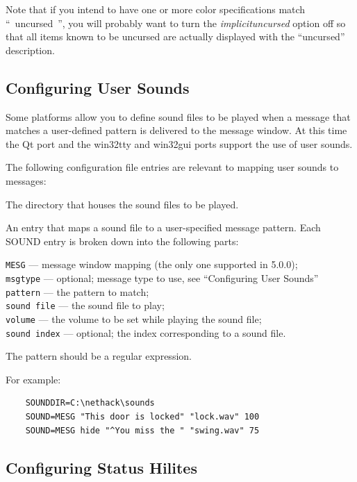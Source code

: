 \documentclass[titlepage]{article}
\begin{document}
Note that if you intend to have one or more color specifications match
``~uncursed~'', you will probably want to turn the
\textit{implicit\textunderscore uncursed}
option off so that all items known to be uncursed are actually
displayed with the ``uncursed'' description.

\subsection*{Configuring User Sounds}

Some platforms allow you to define sound files to be played when a message
that matches a user-defined pattern is delivered to the message window.
At this time the Qt port and the win32tty and win32gui ports support the
use of user sounds.

The following configuration file entries are relevant to mapping user sounds
to messages:

\begin{description}[font=\mdseries\itshape]
\item[SOUNDDIR]
The directory that houses the sound files to be played.
\item[SOUND]
An entry that maps a sound file to a user-specified message pattern.
Each SOUND entry is broken down into the following parts:

\texttt{MESG} --- message window mapping (the only one supported in 5.0.0);\\
\texttt{msgtype} --- optional; message type to use, see ``Configuring User Sounds''\\
\texttt{pattern} --- the pattern to match;\\
\texttt{sound file} --- the sound file to play;\\
\texttt{volume} --- the volume to be set while playing the sound file;\\
\texttt{sound index} --- optional; the index corresponding to a sound file.
\end{description}

The pattern should be a regular expression.

For example:

\begin{verbatim}
    SOUNDDIR=C:\nethack\sounds
    SOUND=MESG "This door is locked" "lock.wav" 100
    SOUND=MESG hide "^You miss the " "swing.wav" 75
\end{verbatim}

\subsection*{Configuring Status Hilites}
\end{document}
